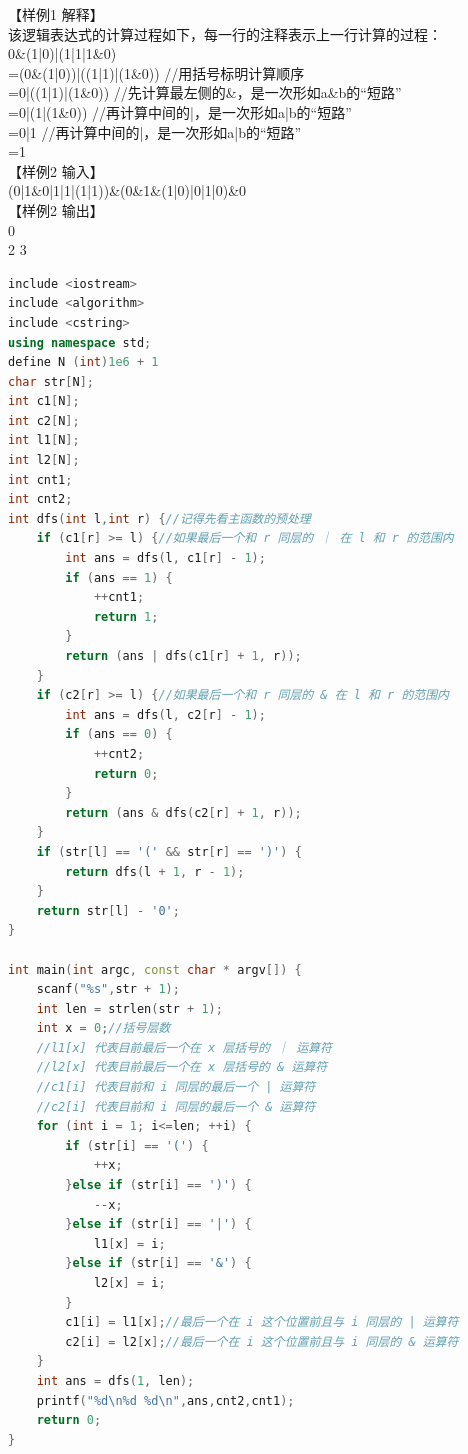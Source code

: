 \documentclass[12pt,twiside,a4paper]{ctexbook}
\numberwithin{chapter}{part}
\begin{document}
【样例1 解释】\\
该逻辑表达式的计算过程如下，每一行的注释表示上一行计算的过程：\\
0\&(1|0)|(1|1|1\&0)\\
=(0\&(1|0))|((1|1)|(1\&0)) //用括号标明计算顺序\\
=0|((1|1)|(1\&0)) //先计算最左侧的\&，是一次形如a\&b的“短路”\\
=0|(1|(1\&0)) //再计算中间的|，是一次形如a|b的“短路”\\
=0|1 //再计算中间的|，是一次形如a|b的“短路”\\
=1\\
【样例2 输入】\\
(0|1\&0|1|1|(1|1))\&(0\&1\&(1|0)|0|1|0)\&0\\
【样例2 输出】\\
0\\
2 3
\begin{lstlisting}[language=C++,breaklines=true]
include <iostream>
include <algorithm>
include <cstring>
using namespace std;
define N (int)1e6 + 1
char str[N];
int c1[N];
int c2[N];
int l1[N];
int l2[N];
int cnt1;
int cnt2;
int dfs(int l,int r) {//记得先看主函数的预处理
    if (c1[r] >= l) {//如果最后一个和 r 同层的 ｜ 在 l 和 r 的范围内
        int ans = dfs(l, c1[r] - 1);
        if (ans == 1) {
            ++cnt1;
            return 1;
        }
        return (ans | dfs(c1[r] + 1, r));
    }
    if (c2[r] >= l) {//如果最后一个和 r 同层的 & 在 l 和 r 的范围内
        int ans = dfs(l, c2[r] - 1);
        if (ans == 0) {
            ++cnt2;
            return 0;
        }
        return (ans & dfs(c2[r] + 1, r));
    }
    if (str[l] == '(' && str[r] == ')') {
        return dfs(l + 1, r - 1);
    }
    return str[l] - '0';
}

int main(int argc, const char * argv[]) {
    scanf("%s",str + 1);
    int len = strlen(str + 1);
    int x = 0;//括号层数
    //l1[x] 代表目前最后一个在 x 层括号的 ｜ 运算符
    //l2[x] 代表目前最后一个在 x 层括号的 & 运算符
    //c1[i] 代表目前和 i 同层的最后一个 | 运算符
    //c2[i] 代表目前和 i 同层的最后一个 & 运算符
    for (int i = 1; i<=len; ++i) {
        if (str[i] == '(') {
            ++x;
        }else if (str[i] == ')') {
            --x;
        }else if (str[i] == '|') {
            l1[x] = i;
        }else if (str[i] == '&') {
            l2[x] = i;
        }
        c1[i] = l1[x];//最后一个在 i 这个位置前且与 i 同层的 | 运算符
        c2[i] = l2[x];//最后一个在 i 这个位置前且与 i 同层的 & 运算符
    }
    int ans = dfs(1, len);
    printf("%d\n%d %d\n",ans,cnt2,cnt1);
    return 0;
}
\end{lstlisting}
\end{document}
